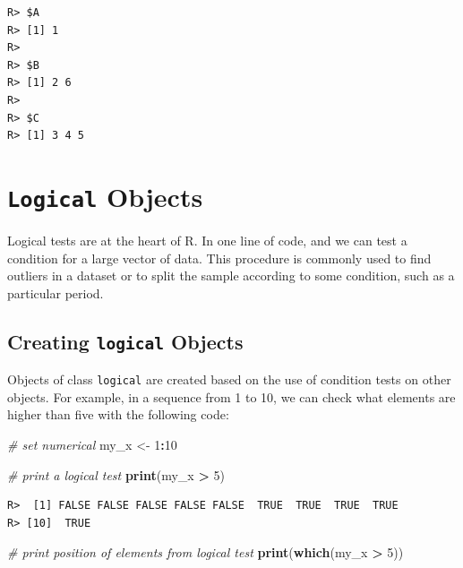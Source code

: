 \documentclass[
  12pt,
]{book}
\newenvironment{Shaded}{\begin{snugshade}}{\end{snugshade}}
\newcommand{\CommentTok}[1]{\textcolor[rgb]{0.37,0.37,0.37}{\textit{#1}}}
\newcommand{\DecValTok}[1]{\textcolor[rgb]{0.06,0.06,0.06}{#1}}
\newcommand{\KeywordTok}[1]{\textcolor[rgb]{0.27,0.27,0.27}{\textbf{#1}}}
\newcommand{\NormalTok}[1]{#1}
\newcommand{\OperatorTok}[1]{\textcolor[rgb]{0.43,0.43,0.43}{\textbf{#1}}}
\newcommand{\StringTok}[1]{\textcolor[rgb]{0.5,0.5,0.5}{#1}}
\begin{document}
\begin{verbatim}
R> $A
R> [1] 1
R> 
R> $B
R> [1] 2 6
R> 
R> $C
R> [1] 3 4 5
\end{verbatim}

\hypertarget{logical-objects}{%
\section{\texorpdfstring{\texttt{Logical} Objects}{Logical Objects}}\label{logical-objects}}

Logical tests are at the heart of R. In one line of code, and we can test a condition for a large vector of data. This procedure is commonly used to find outliers in a dataset or to split the sample according to some condition, such as a particular period.

\hypertarget{creating-logical-objects}{%
\subsection{\texorpdfstring{Creating \texttt{logical} Objects}{Creating logical Objects}}\label{creating-logical-objects}}

Objects of class \texttt{logical} are created based on the use of condition tests on other objects. For example, in a sequence from 1 to 10, we can check what elements are higher than five with the following code:

\begin{Shaded}
\begin{Highlighting}[]
\CommentTok{# set numerical}
\NormalTok{my_x <-}\StringTok{ }\DecValTok{1}\OperatorTok{:}\DecValTok{10}

\CommentTok{# print a logical test}
\KeywordTok{print}\NormalTok{(my_x }\OperatorTok{>}\StringTok{ }\DecValTok{5}\NormalTok{)}
\end{Highlighting}
\end{Shaded}

\begin{verbatim}
R>  [1] FALSE FALSE FALSE FALSE FALSE  TRUE  TRUE  TRUE  TRUE
R> [10]  TRUE
\end{verbatim}

\begin{Shaded}
\begin{Highlighting}[]
\CommentTok{# print position of elements from logical test}
\KeywordTok{print}\NormalTok{(}\KeywordTok{which}\NormalTok{(my_x }\OperatorTok{>}\StringTok{ }\DecValTok{5}\NormalTok{))}
\end{Highlighting}
\end{Shaded}
\end{document}
